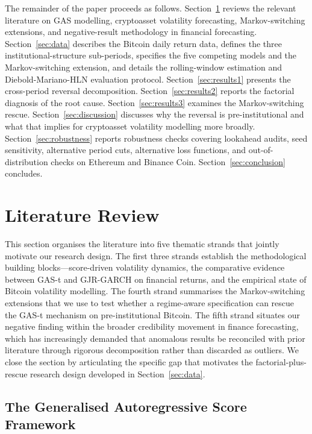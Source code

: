 The remainder of the paper proceeds as follows. Section~\ref{sec:lit} reviews the relevant literature on GAS modelling, cryptoasset volatility forecasting, Markov-switching extensions, and negative-result methodology in financial forecasting. Section~\ref{sec:data} describes the Bitcoin daily return data, defines the three institutional-structure sub-periods, specifies the five competing models and the Markov-switching extension, and details the rolling-window estimation and Diebold-Mariano-HLN evaluation protocol. Section~\ref{sec:results1} presents the cross-period reversal decomposition. Section~\ref{sec:results2} reports the factorial diagnosis of the root cause. Section~\ref{sec:results3} examines the Markov-switching rescue. Section~\ref{sec:discussion} discusses why the reversal is pre-institutional and what that implies for cryptoasset volatility modelling more broadly. Section~\ref{sec:robustness} reports robustness checks covering lookahead audits, seed sensitivity, alternative period cuts, alternative loss functions, and out-of-distribution checks on Ethereum and Binance Coin. Section~\ref{sec:conclusion} concludes.

\section{Literature Review}
\label{sec:lit}

This section organises the literature into five thematic strands that jointly motivate our research design. The first three strands establish the methodological building blocks---score-driven volatility dynamics, the comparative evidence between GAS-t and GJR-GARCH on financial returns, and the empirical state of Bitcoin volatility modelling. The fourth strand summarises the Markov-switching extensions that we use to test whether a regime-aware specification can rescue the GAS-t mechanism on pre-institutional Bitcoin. The fifth strand situates our negative finding within the broader credibility movement in finance forecasting, which has increasingly demanded that anomalous results be reconciled with prior literature through rigorous decomposition rather than discarded as outliers. We close the section by articulating the specific gap that motivates the factorial-plus-rescue research design developed in Section~\ref{sec:data}.

\subsection{The Generalised Autoregressive Score Framework}

